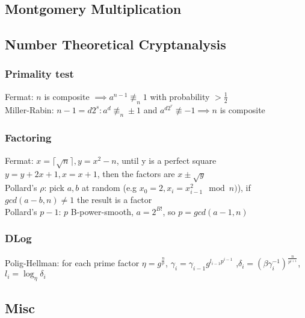 \documentclass[twoside, 11pt]{article}
\begin{document}
        \subsection*{Montgomery Multiplication}

        \subsection*{Number Theoretical Cryptanalysis}
            \subsubsection*{Primality test}
                Fermat: $n$ is composite $\implies a^{n-1} \not\equiv_{n} 1$ with probability $> \frac{1}{2}$ \\ 
                Miller-Rabin: $n-1=d2^{s}: a^{d} \not\equiv_{n} \pm 1$ and $a^{d2^{r}} \not\equiv -1 \implies n$ is composite \\
            \subsubsection*{Factoring}
                Fermat: $x = \lceil \sqrt{n} \rceil, y=x^{2}-n$, until y is a perfect square $y=y+2x+1, x = x+1$, then the factors are $x \pm \sqrt{y}$ \\
                Pollard's $\rho$: pick $a, b$ at random (e.g $x_{0}=2, x_{i}=x_{i-1}^{2} \mod{n})$), if $gcd(a-b, n) \neq 1$ the result is a factor \\
                Pollard's $p-1$: $p$ B-power-smooth, $a=2^{B!}$, so $p=gcd(a-1, n)$
            \subsubsection*{DLog}
                Polig-Hellman: for each prime factor $\eta = g^{\frac{n}{p}}$, $\gamma_{i}=\gamma_{i-1}g^{l_{i-1}p^{i-1}}$ ,$\delta_{i}=(\beta\gamma_{i}^{-1})^{\frac{n}{p^{i+1}}}$, $l_{i}=\log_{\eta}\delta_{i}$

        \subsection*{Misc}
\end{document}
